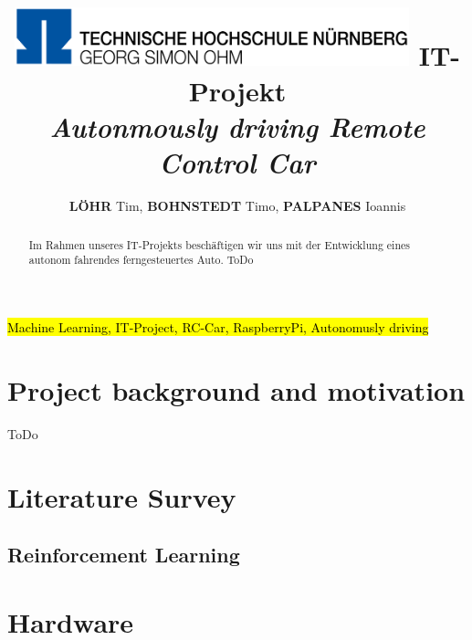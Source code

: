 \documentclass[journal]{IEEEtran}
\begin{document}
	
    \title{    
    \includegraphics[width=4.5in]{photo/logo.png}
    \newline \newline
     IT-Projekt \\ 
     \textit{Autonmously driving Remote Control Car}
     }

  \author{
      \textbf{L\"OHR} Tim,
      \textbf{BOHNSTEDT} Timo, 
      \textbf{PALPANES} Ioannis
}



\maketitle
\begin{abstract}
Im Rahmen unseres IT-Projekts beschäftigen wir uns mit der Entwicklung eines autonom fahrendes ferngesteuertes Auto. 
ToDo
\end{abstract}

\begin{IEEEkeywords}
\hl{Machine Learning, IT-Project, RC-Car, RaspberryPi, Autonomusly driving}
\end{IEEEkeywords}
\IEEEpeerreviewmaketitle

\section{Project background and motivation}
ToDo

\section{Literature Survey}
\subsection{Reinforcement Learning}

\section{Hardware}
\end{document}
